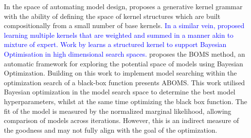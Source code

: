 In the space of automating model design, \cite{Duvenaud2013} proposes a generative kernel grammar with the ability of defining the space of kernel structures which are built compositionally from a small number of base kernels. \textcolor{blue}{In a similar vein, \cite{gonen2013localized} proposed learning multiple kernels that are weighted and summed in a manner akin to mixture of expert. Work by \cite{pmlr-v70-wang17h} learns a structured kernel to support Bayesian Optimisation in high dimensional search spaces.} \cite{malkomes2016bayesian} proposes the BOMS method, an automatic framework for exploring the potential space of models using Bayesian Optimization. Building on this work to implement model searching within the optimization search of a black-box function \cite{Malkomes:2018:ABO:3327345.3327498} presents ABOMS. This work utilised Bayesian optimization in the model search space to determine the best model hyperparameters, whilst at the same time optimizing the black box function. The fit of the model is measured by the normalized marginal likelihood, allowing comparison of models across iterations. However, this is an indirect measure of the goodness and may not fully align with the goal of the optimization.
